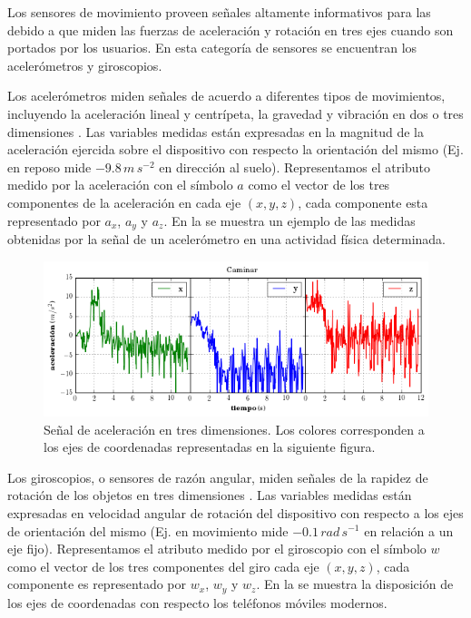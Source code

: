 Los sensores de movimiento proveen señales altamente informativos
para las  debido a que miden las fuerzas de aceleración
y rotación en tres ejes cuando son portados por los usuarios. En esta
categoría de sensores se encuentran los acelerómetros y giroscopios. 

Los acelerómetros miden señales de acuerdo a diferentes tipos de movimientos,
incluyendo la aceleración lineal y centrípeta, la gravedad y vibración
en dos o tres dimensiones \cite{Goehl2007}. Las variables medidas
están expresadas en la magnitud de la aceleración ejercida sobre el
dispositivo con respecto la orientación del mismo (Ej. en reposo mide
$-9.8\,m\,s^{-2}$ en dirección al suelo). Representamos el atributo
medido por la aceleración con el símbolo $a$ como el vector de los
tres componentes de la aceleración en cada eje $(x,y,z)$, cada componente
esta representado por $a_{x}$, $a_{y}$ y $a_{z}$. En la 
se muestra un ejemplo de las medidas obtenidas por la señal de un
acelerómetro en una actividad física determinada.

\begin{figure}[!tbph]
\begin{centering}
\includegraphics[width=1\columnwidth]{capitulo-4/graphics/signal_a3d}
\par\end{centering}
\caption[Señal de aceleración]{\label{fig4:muestra-ac}Señal de aceleración en tres dimensiones.
Los colores corresponden a los ejes de coordenadas representadas en
la siguiente figura.}
\end{figure}

Los giroscopios, o sensores de razón angular, miden señales de la
rapidez de rotación de los objetos en tres dimensiones \cite{Goehl2007}.
Las variables medidas están expresadas en velocidad angular de rotación
del dispositivo con respecto a los ejes de orientación del mismo (Ej.
en movimiento mide \foreignlanguage{english}{$-0.1\,rad\,s^{-1}$}
en relación a un eje fijo). Representamos el atributo medido por el
giroscopio con el símbolo $w$ como el vector de los tres componentes
del giro cada eje $(x,y,z)$, cada componente es representado por
$w_{x}$, $w_{y}$ y $w_{z}$. En la  se
muestra la disposición de los ejes de coordenadas con respecto los
teléfonos móviles modernos.

